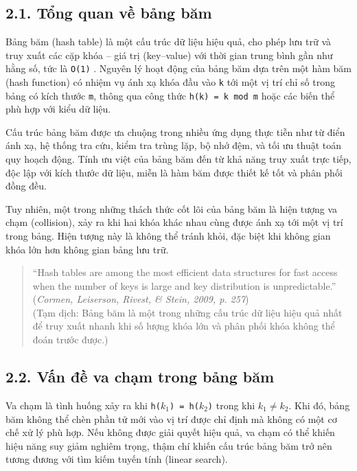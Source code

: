 \documentclass[12pt,a4paper]{report}
\begin{document}
\newpage
\chapter*{}

\section*{2.1. Tổng quan về bảng băm}
\noindent \indent Bảng băm (hash table) là một cấu trúc dữ liệu hiệu quả, cho phép lưu trữ và truy xuất các cặp khóa – giá trị (key–value) với thời gian trung bình gần như hằng số, tức là \texttt{O(1)} \cite{cormen2009}. Nguyên lý hoạt động của bảng băm dựa trên một hàm băm (hash function) có nhiệm vụ ánh xạ khóa đầu vào \texttt{k} tới một vị trí chỉ số trong bảng có kích thước \texttt{m}, thông qua công thức \texttt{h(k) = k mod m} hoặc các biến thể phù hợp với kiểu dữ liệu.

Cấu trúc bảng băm được ưa chuộng trong nhiều ứng dụng thực tiễn như từ điển ánh xạ, hệ thống tra cứu, kiểm tra trùng lặp, bộ nhớ đệm, và tối ưu thuật toán quy hoạch động. Tính ưu việt của bảng băm đến từ khả năng truy xuất trực tiếp, độc lập với kích thước dữ liệu, miễn là hàm băm được thiết kế tốt và phân phối đồng đều.

Tuy nhiên, một trong những thách thức cốt lõi của bảng băm là hiện tượng va chạm (collision), xảy ra khi hai khóa khác nhau cùng được ánh xạ tới một vị trí trong bảng. Hiện tượng này là không thể tránh khỏi, đặc biệt khi không gian khóa lớn hơn không gian bảng lưu trữ.
\begin{quote}
“Hash tables are among the most efficient data structures for fast access when the number of keys is large and key distribution is unpredictable.”
(\textit{Cormen, Leiserson, Rivest, \& Stein, 2009, p. 257}) \\
(Tạm dịch: Bảng băm là một trong những cấu trúc dữ liệu hiệu quả nhất để truy xuất nhanh khi số lượng khóa lớn và phân phối khóa không thể đoán trước được.)
\end{quote}
\section*{2.2. Vấn đề va chạm trong bảng băm}
\noindent \indent Va chạm là tình huống xảy ra khi \texttt{h($k_1$) = h($k_2$)} trong khi \texttt{$k_1 \neq k_2$}. Khi đó, bảng băm không thể chèn phần tử mới vào vị trí được chỉ định mà không có một cơ chế xử lý phù hợp. Nếu không được giải quyết hiệu quả, va chạm có thể khiến hiệu năng suy giảm nghiêm trọng, thậm chí khiến cấu trúc bảng băm trở nên tương đương với tìm kiếm tuyến tính (linear search).
\end{document}
